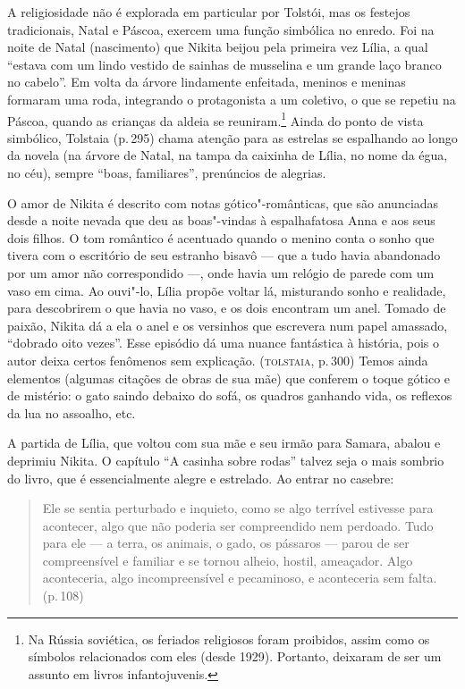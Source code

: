 A religiosidade não é explorada em particular por Tolstói, mas os
festejos tradicionais, Natal e Páscoa, exercem uma função simbólica no
enredo. Foi na noite de Natal (nascimento) que Nikita beijou pela
primeira vez Lília, a qual ``estava com um lindo vestido de sainhas de
musselina e um grande laço branco no cabelo''. Em volta da árvore
lindamente enfeitada, meninos e meninas formaram uma roda, integrando o
protagonista a um coletivo, o que se repetiu na Páscoa, quando as
crianças da aldeia se reuniram.\footnote{Na Rússia soviética, os
  feriados religiosos foram proibidos, assim como os símbolos
  relacionados com eles (desde 1929). Portanto, deixaram de ser um
  assunto em livros infantojuvenis.} Ainda do ponto de vista simbólico,
Tolstaia (p.\,295) chama atenção para as estrelas se espalhando ao longo
da novela (na árvore de Natal, na tampa da caixinha de Lília, no nome da
égua, no céu), sempre ``boas, familiares'', prenúncios de alegrias.

O amor de Nikita é descrito com notas gótico"-românticas, que são
anunciadas desde a noite nevada que deu as boas"-vindas à espalhafatosa
Anna e aos seus dois filhos. O tom romântico é acentuado quando o menino
conta o sonho que tivera com o escritório de seu estranho bisavô --- que
a tudo havia abandonado por um amor não correspondido ---, onde havia um
relógio de parede com um vaso em cima. Ao ouvi"-lo, Lília propõe voltar
lá, misturando sonho e realidade, para descobrirem o que havia no vaso,
e os dois encontram um anel. Tomado de paixão, Nikita dá a ela o anel e
os versinhos que escrevera num papel amassado, ``dobrado oito vezes''.
Esse episódio dá uma nuance fantástica à história, pois o autor deixa
certos fenômenos sem explicação. (\textsc{tolstaia}, p.\,300) Temos ainda
elementos (algumas citações de obras de sua mãe) que conferem o toque
gótico e de mistério: o gato saindo debaixo do sofá, os quadros ganhando
vida, os reflexos da lua no assoalho, etc.

A partida de Lília, que voltou com sua mãe e seu irmão para Samara,
abalou e deprimiu Nikita. O capítulo ``A casinha sobre rodas'' talvez
seja o mais sombrio do livro, que é essencialmente alegre e estrelado.
Ao entrar no casebre:

\begin{quote}
Ele se sentia perturbado e inquieto, como se algo terrível estivesse
para acontecer, algo que não poderia ser compreendido nem perdoado. Tudo
para ele --- a terra, os animais, o gado, os pássaros --- parou de ser
compreensível e familiar e se tornou alheio, hostil, ameaçador. Algo
aconteceria, algo incompreensível e pecaminoso, e aconteceria sem falta.
(p.\,108)
\end{quote}

